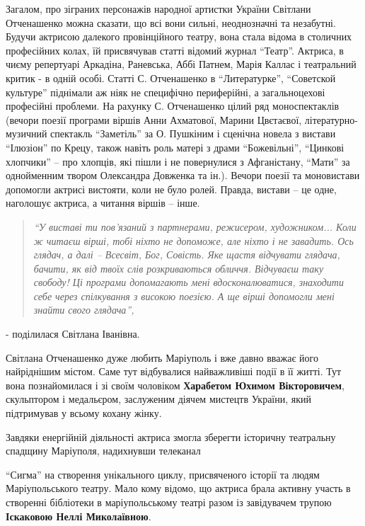 Загалом, про зіграних персонажів народної артистки України Світлани Отченашенко
можна сказати, що всі вони сильні, неоднозначні та незабутні. Будучи актрисою
далекого провінційного театру, вона стала відома в столичних професійних колах,
їй присвячував статті відомий журнал \enquote{Театр}. Актриса, в чиєму репертуарі
Аркадіна, Раневська, Аббі Патнем, Марія Каллас і театральний критик - в одній
особі. Статті С. Отченашенко в \enquote{Литературке}, \enquote{Советской культуре} піднімали аж
ніяк не специфічно периферійні, а загальноцехові професійні проблеми. На
рахунку С. Отченашенко цілий ряд моноспектаклів (вечори поезії програми віршів
Анни Ахматової, Марини Цвєтаєвої, літературно-музичний спектакль \enquote{Заметіль} за
О. Пушкіним і сценічна новела з вистави \enquote{Ілюзіон} по Крецу, також навіть роль
матері з драми \enquote{Божевільні}, \enquote{Цинкові хлопчики} – про хлопців, які пішли і не
повернулися з Афганістану, \enquote{Мати} за однойменним твором Олександра Довженка та
ін.). Вечори поезії та моновистави допомогли актрисі вистояти, коли не було
ролей. Правда, вистави – це одне, наголошує актриса, а читання віршів – інше.
\begin{quote}
\em\enquote{У виставі ти пов'язаний з партнерами, режисером, художником... Коли ж читаєш
вірші, тобі ніхто не допоможе, але ніхто і не завадить. Ось глядач, а далі –
Всесвіт, Бог, Совість. Яке щастя відчувати глядача, бачити, як від твоїх слів
розкриваються обличчя. Відчуваєш таку свободу! Ці програми допомагають мені
вдосконалюватися, знаходити себе через спілкування з високою поезією. А ще
вірші допомогли мені знайти свого глядача}, 
\end{quote}
- поділилася Світлана Іванівна.


Світлана Отченашенко дуже любить Маріуполь і вже давно вважає його найріднішим
містом. Саме тут відбувалися найважливіші події в її житті. Тут вона
познайомилася і зі своїм чоловіком \textbf{Харабетом Юхимом Вікторовичем}, скульптором і
медальєром, заслуженим діячем мистецтв України, який підтримував у всьому
кохану жінку.


Завдяки енергійній діяльності актриса змогла зберегти історичну театральну
спадщину Маріуполя, надихнувши телеканал \par\noindent\enquote{Сигма} на створення унікального
циклу, присвяченого історії та людям Маріупольського театру. Мало кому відомо,
що актриса брала активну участь в створенні бібліотеки в маріупольському театрі
разом із завідувачем трупою \textbf{Іскаковою Неллі Миколаївною}.

